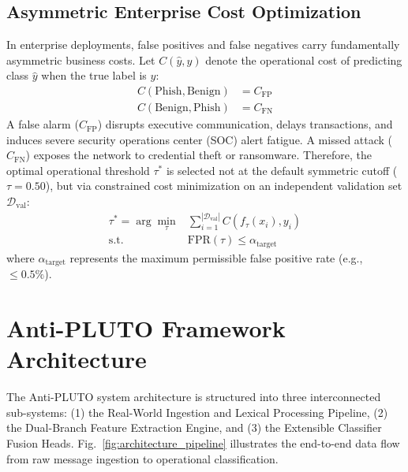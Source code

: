 \documentclass[journal]{IEEEtran}
\begin{document}
\subsection{Asymmetric Enterprise Cost Optimization}
\label{sec:cost_opt}
In enterprise deployments, false positives and false negatives carry fundamentally asymmetric business costs. Let $C(\hat{y}, y)$ denote the operational cost of predicting class $\hat{y}$ when the true label is $y$:
\begin{equation}
\begin{aligned}
    C(\text{Phish}, \text{Benign}) &= C_{\text{FP}} \\
    C(\text{Benign}, \text{Phish}) &= C_{\text{FN}}
\end{aligned}
\end{equation}
A false alarm ($C_{\text{FP}}$) disrupts executive communication, delays transactions, and induces severe security operations center (SOC) alert fatigue. A missed attack ($C_{\text{FN}}$) exposes the network to credential theft or ransomware. Therefore, the optimal operational threshold $\tau^*$ is selected not at the default symmetric cutoff ($\tau = 0.50$), but via constrained cost minimization on an independent validation set $\mathcal{D}_{\text{val}}$:
\begin{equation}
\label{eq:threshold_opt}
\begin{aligned}
    \tau^* = \arg\min_{\tau} & \sum_{i=1}^{|\mathcal{D}_{\text{val}}|} C\left(f_{\tau}(x_i), y_i\right) \\
    \text{s.t.} \quad & \text{FPR}(\tau) \le \alpha_{\text{target}}
\end{aligned}
\end{equation}
where $\alpha_{\text{target}}$ represents the maximum permissible false positive rate (e.g., $\le 0.5\%$).

\section{Anti-PLUTO Framework Architecture}
\label{sec:architecture}

The Anti-PLUTO system architecture is structured into three interconnected sub-systems: (1) the Real-World Ingestion and Lexical Processing Pipeline, (2) the Dual-Branch Feature Extraction Engine, and (3) the Extensible Classifier Fusion Heads. Fig.~\ref{fig:architecture_pipeline} illustrates the end-to-end data flow from raw message ingestion to operational classification.
\end{document}
